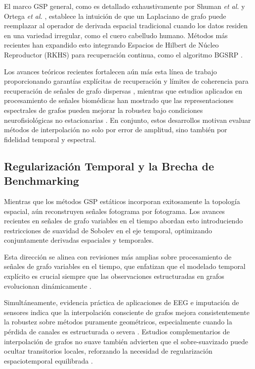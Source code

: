 El marco GSP general, como es detallado exhaustivamente por Shuman \emph{et al.} \cite{shuman2013} y Ortega \emph{et al.} \cite{ortega2018}, establece la intuición de que un Laplaciano de grafo puede reemplazar al operador de derivada espacial tradicional cuando los datos residen en una variedad irregular, como el cuero cabelludo humano. Métodos más recientes han expandido esto integrando Espacios de Hilbert de Núcleo Reproductor (RKHS) para recuperación continua, como el algoritmo BGSRP \cite{zhang2024bgsrp}.

Los avances teóricos recientes fortalecen aún más esta línea de trabajo proporcionando garantías explícitas de recuperación y límites de coherencia para recuperación de señales de grafo dispersas \cite{morgenstern_theoretical_2025}, mientras que estudios aplicados en procesamiento de señales biomédicas han mostrado que las representaciones espectrales de grafos pueden mejorar la robustez bajo condiciones neurofisiológicas no estacionarias \cite{miri_spectral_2024}. En conjunto, estos desarrollos motivan evaluar métodos de interpolación no solo por error de amplitud, sino también por fidelidad temporal y espectral.

\subsection{Regularización Temporal y la Brecha de Benchmarking}
Mientras que los métodos GSP estáticos incorporan exitosamente la topología espacial, aún reconstruyen señales fotograma por fotograma. Los avances recientes en señales de grafo variables en el tiempo \cite{giraldo2022} abordan esto introduciendo restricciones de suavidad de Sobolev en el eje temporal, optimizando conjuntamente derivadas espaciales y temporales.

Esta dirección se alinea con revisiones más amplias sobre procesamiento de señales de grafo variables en el tiempo, que enfatizan que el modelado temporal explícito es crucial siempre que las observaciones estructuradas en grafos evolucionan dinámicamente \cite{yan_signal_2026, krishnan_learning_2026}.

Simultáneamente, evidencia práctica de aplicaciones de EEG e imputación de sensores indica que la interpolación consciente de grafos mejora consistentemente la robustez sobre métodos puramente geométricos, especialmente cuando la pérdida de canales es estructurada o severa \cite{weinstein_imputing_2023, jiang_graph-based_2021}. Estudios complementarios de interpolación de grafos no suave también advierten que el sobre-suavizado puede ocultar transitorios locales, reforzando la necesidad de regularización espaciotemporal equilibrada \cite{mazarguil_non-smooth_2022}.

